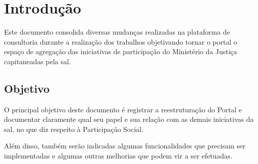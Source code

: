 \chapter{Introdução}
Este documento consolida diversas mudanças realizadas na plataforma \ppod de consultoria durante a realização dos trabalhos objetivando tornar o portal \ppod o espaço de agregação das iniciativas de participação do Ministério da Justiça capitaneadas pela \gls{sal}.

\section{Objetivo}
O principal objetivo deste documento é registrar a reestruturação do Portal \ppod e documentar claramente qual seu papel e sua relação com as demais iniciativas da \gls{sal}, no que diz respeito à Participação Social.

Além disso, também serão indicadas algumas funcionalidades que precisam ser implementadas e algumas outras melhorias que podem vir a ser efetuadas.